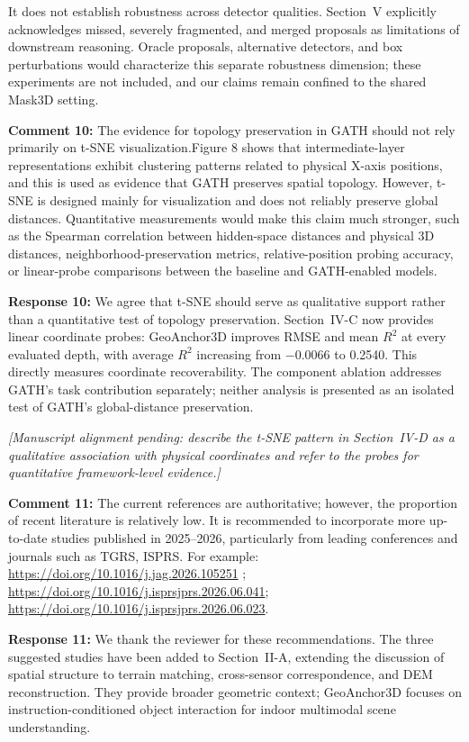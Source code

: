 It does not establish robustness across detector qualities. Section~V explicitly acknowledges missed, severely fragmented, and merged proposals as limitations of downstream reasoning. Oracle proposals, alternative detectors, and box perturbations would characterize this separate robustness dimension; these experiments are not included, and our claims remain confined to the shared Mask3D setting.
\vspace{\resafter}


{\noindent\color{comment}
\textbf{Comment 10:}
The evidence for topology preservation in GATH should not rely primarily on t-SNE visualization.Figure 8 shows that intermediate-layer representations exhibit clustering patterns related to physical X-axis positions, and this is used as evidence that GATH preserves spatial topology.  However, t-SNE is designed mainly for visualization and does not reliably preserve global distances. Quantitative measurements would make this claim much stronger, such as the Spearman correlation between hidden-space distances and physical 3D distances, neighborhood-preservation metrics, relative-position probing accuracy, or linear-probe comparisons between the baseline and GATH-enabled models.
}\vspace{\comafter}

\noindent\textbf{Response 10:}
We agree that t-SNE should serve as qualitative support rather than a quantitative test of topology preservation. Section~IV-C now provides linear coordinate probes: GeoAnchor3D improves RMSE and mean $R^2$ at every evaluated depth, with average $R^2$ increasing from $-0.0066$ to 0.2540. This directly measures coordinate recoverability. The component ablation addresses GATH's task contribution separately; neither analysis is presented as an isolated test of GATH's global-distance preservation.

\textit{[Manuscript alignment pending: describe the t-SNE pattern in Section~IV-D as a qualitative association with physical coordinates and refer to the probes for quantitative framework-level evidence.]}
\vspace{\resafter}


{\noindent\color{comment}
\textbf{Comment 11:}
The current references are authoritative; however, the proportion of recent literature is relatively low. It is recommended to incorporate more up-to-date studies published in 2025--2026, particularly from leading conferences and journals such as TGRS, ISPRS. For example:  
\url{https://doi.org/10.1016/j.jag.2026.105251} ;
\url{https://doi.org/10.1016/j.isprsjprs.2026.06.041};
\url{https://doi.org/10.1016/j.isprsjprs.2026.06.023}.
}\vspace{\comafter}

\noindent\textbf{Response 11:}
We thank the reviewer for these recommendations. The three suggested studies have been added to Section~II-A, extending the discussion of spatial structure to terrain matching, cross-sensor correspondence, and DEM reconstruction. They provide broader geometric context; GeoAnchor3D focuses on instruction-conditioned object interaction for indoor multimodal scene understanding.
\vspace{\resafter}
